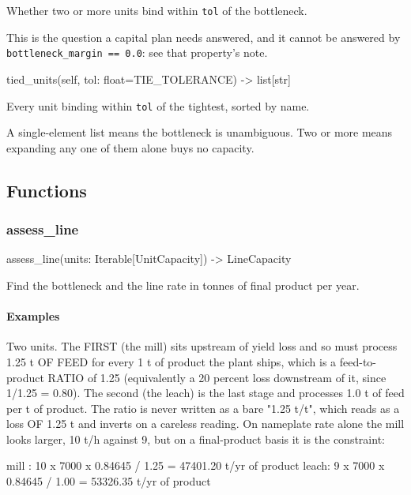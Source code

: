 \documentclass[10pt,a4paper,twoside]{report}
\begin{document}
Whether two or more units bind within \texttt{tol} of the bottleneck.

This is the question a capital plan needs answered, and it cannot be answered by \texttt{bottleneck\_margin == 0.0}: see that property's note.

\begin{verbatimsmall}
tied_units(self, tol: float=TIE_TOLERANCE) -> list[str]
\end{verbatimsmall}

Every unit binding within \texttt{tol} of the tightest, sorted by name.

A single-element list means the bottleneck is unambiguous. Two or more means expanding any one of them alone buys no capacity.

\subsection*{Functions}

\subsubsection*{assess\_line}

\begin{verbatimsmall}
assess_line(units: Iterable[UnitCapacity]) -> LineCapacity
\end{verbatimsmall}

Find the bottleneck and the line rate in tonnes of final product per year.

\paragraph*{Examples}

Two units. The FIRST (the mill) sits upstream of yield loss and so must process 1.25 t OF FEED for every 1 t of product the plant ships, which is a feed-to-product RATIO of 1.25 (equivalently a 20 percent loss downstream of it, since 1/1.25 = 0.80). The second (the leach) is the last stage and processes 1.0 t of feed per t of product. The ratio is never written as a bare "1.25 t/t", which reads as a loss OF 1.25 t and inverts on a careless reading. On nameplate rate alone the mill looks larger, 10 t/h against 9, but on a final-product basis it is the constraint:

\begin{verbatimsmall}
mill : 10 x 7000 x 0.84645 / 1.25 = 47401.20 t/yr of product
leach:  9 x 7000 x 0.84645 / 1.00 = 53326.35 t/yr of product
\end{verbatimsmall}
\end{document}
